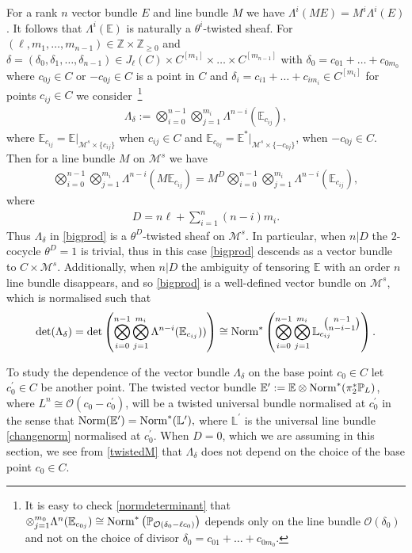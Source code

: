 \documentclass[12pt]{article}
\numberwithin{equation}{section}
\theoremstyle{remark}
\theoremstyle{definition}
\numberwithin{theorem}{section}
\def\beq{\begin{eqnarray}}
\def\eeq{\end{eqnarray}}
\def\bP{{\mathbb P}}
\def\nm{{\mathit Norm}}
\def\Nm{{\rm Norm}}
\def\bE{{\mathbb{E}}}
\def\E{\mathbb{E}}
\def\L{\mathbb{L}}
\def\M{{\mathcal{M}}}
\def\calO{{\mathcal O}}
\def\Z{\mathbb{Z}}
\newcommand{\bino}[2]{\mbox{ $\binom{#1}{#2}$}}
\def\d{{{\delta}}}
\renewcommand{\1}{\mathbbm{1}}
\begin{document}
For a rank $n$ vector bundle $E$ and line bundle $M$ we have  $\Lambda^{i}(ME)=M^i\Lambda^i(E)$. It follows that $\Lambda^i(\bE)$ is naturally a $\theta^i$-twisted sheaf. For  $(\ell,m_1,\dots,m_{n-1})\in \Z\times \Z_{\geq 0}$  and  $\d=(\delta_0,\delta_1,\dots,\delta_{n-1})\in J_\ell(C)\times C^{[m_1]}\times\dots\times C^{[m_{n-1}]}$  with $\delta_0=c_{01}+\dots+c_{0m_0}$ where $ c_{0j}\in C$ or $-c_{0j}\in C$ is a point in $C$ and  $\delta_i=c_{i1}+\dots + c_{im_i}\in C^{[m_i]} $ for points $c_{ij}\in C$  we consider~\footnote{It is easy to check \eqref{normdeterminant} that $\otimes_{j=1}^{m_0}\Lambda^n(\E_{c_{0j}})\cong \Nm^*\left(\bP_{\calO(\delta_0-\ell c_0)}\right)$ depends only on the line bundle $\calO(\delta_0)$ and not on the choice of divisor $\delta_0=c_{01}+\dots+c_{0m_0}$.}   \beq\label{bigprod}\Lambda_\delta:=\bigotimes_{i=0}^{n-1}\bigotimes_{j=1}^{m_i} \Lambda^{n-i}(\bE_{c_{ij}}), \eeq  where $\bE_{c_{ij}}=\bE|_{\M^s\times{\{c_{ij}\}}}$ when $c_{ij}\in C$ and $\bE_{c_{0j}}=\bE^*|_{\M^s\times{\{-c_{0j}\}}}$, when $-c_{0j}\in C$. Then for a line bundle $M$ on $\M^s$ we have \beq \label{twistedM}\bigotimes_{i=0}^{n-1}\bigotimes_{j=1}^{m_i} \Lambda^{n-i}(M\bE_{c_{ij}})=M^{D}\bigotimes_{i=0}^{n-1}\bigotimes_{j=1}^{m_i}  \Lambda^{n-i}(\bE_{c_{ij}}),\eeq where \beq \label{D}D=n\ell+\sum_{i=1}^n(n-i)m_i.\eeq Thus $\Lambda_\delta$ in \eqref{bigprod} is a $\theta^{D}$-twisted sheaf on $\M^s$. In particular, when $n|D$ the $2$-cocycle  $\theta^D=1$ is trivial, thus in this case \eqref{bigprod} descends as a vector bundle to $C\times\M^s$. Additionally, when $n|D$ the ambiguity of tensoring $\E$ with an order $n$ line bundle disappears, and so \eqref{bigprod} is a well-defined vector bundle on $\M^s$, which is normalised such that  \beq\label{bignorm}\det(\Lambda_\delta)=\det\left(\bigotimes_{i=0}^{n-1}\bigotimes_{j=1}^{m_i} \Lambda^{n-i}(\bE_{c_{ij}}))\right) \cong \Nm^*\left(\bigotimes_{i=0}^{n-1}\bigotimes_{j=1}^{m_i} \L_{c_{ij}}^{\bino{n-1}{n-i-1}}\right).\eeq 

To study the dependence of the vector bundle $\Lambda_\delta$ on the base point $c_0\in C$ let  $c^\prime_0\in C$ be another point. The twisted vector bundle $\bE^\prime:=\bE \otimes \Nm^*(\pi_2^*\bP_{L})$, where $L^n\cong \calO(c_0-c_0^\prime)$, will be a twisted universal bundle normalised at $c^\prime_0$ in the sense that $\Nm(\bE^\prime)=\Nm^*(\L^\prime),$ where $\L^\prime$ is the universal line bundle \eqref{changenorm} normalised at $c^\prime_0$. When $D=0$, which we are assuming in this section, we see from \eqref{twistedM} that $\Lambda_\delta$ does not depend on the choice of the base point $c_0\in C$. 
\end{document}

